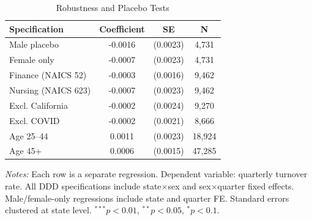 \begin{table}[htbp]
\begin{threeparttable}
\centering
\caption{Robustness and Placebo Tests}
\label{tab:robustness}
\begin{tabular}{lccc}
\toprule
Specification & Coefficient & SE & N \\
\midrule
Male placebo & -0.0016 & (0.0023) & 4,731 \\
Female only & -0.0007 & (0.0023) & 4,731 \\
Finance (NAICS 52) & -0.0003 & (0.0016) & 9,462 \\
Nursing (NAICS 623) & -0.0007 & (0.0023) & 9,462 \\
Excl. California & -0.0002 & (0.0024) & 9,270 \\
Excl. COVID & -0.0002 & (0.0021) & 8,666 \\
Age 25--44 & 0.0011 & (0.0023) & 18,924 \\
Age 45+ & 0.0006 & (0.0015) & 47,285 \\
\bottomrule
\end{tabular}
\begin{tablenotes}
\item \textit{Notes:} Each row is a separate regression. Dependent variable: quarterly turnover rate. All DDD specifications include state$\times$sex and sex$\times$quarter fixed effects. Male/female-only regressions include state and quarter FE. Standard errors clustered at state level. $^{***}p<0.01$, $^{**}p<0.05$, $^{*}p<0.1$.
\end{tablenotes}
\end{threeparttable}
\end{table}
